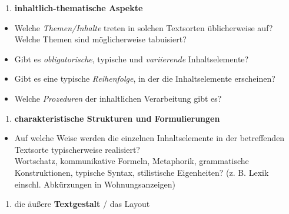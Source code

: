 \documentclass[
  letterpaper,
]{scrbook}
\providecommand{\tightlist}{%
  \setlength{\itemsep}{0pt}\setlength{\parskip}{0pt}}\usepackage{longtable,booktabs,array}
\begin{document}
\begin{enumerate}
\def\labelenumi{\arabic{enumi}.}
\setcounter{enumi}{2}
\tightlist
\item
  \textbf{inhaltlich-thematische Aspekte}\\
\end{enumerate}

\begin{itemize}
\tightlist
\item
  Welche \emph{Themen/Inhalte} treten in solchen Textsorten
  üblicherweise auf? Welche Themen sind möglicherweise tabuisiert?\\
\item
  Gibt es \emph{obligatorische}, typische und \emph{variierende}
  Inhaltselemente?\\
\item
  Gibt es eine typische \emph{Reihenfolge}, in der die Inhaltselemente
  erscheinen?\\
\item
  Welche \emph{Prozeduren} der inhaltlichen Verarbeitung gibt es?\\
\end{itemize}

\begin{enumerate}
\def\labelenumi{\arabic{enumi}.}
\setcounter{enumi}{3}
\tightlist
\item
  \textbf{charakteristische Strukturen und Formulierungen}\\
\end{enumerate}

\begin{itemize}
\tightlist
\item
  Auf welche Weise werden die einzelnen Inhaltselemente in der
  betreffenden Textsorte typischerweise realisiert?\\
  Wortschatz, kommunikative Formeln, Metaphorik, grammatische
  Konstruktionen, typische Syntax, stilistische Eigenheiten? (z. B.
  Lexik einschl. Abkürzungen in Wohnungsanzeigen)\\
\end{itemize}

\begin{enumerate}
\def\labelenumi{\arabic{enumi}.}
\setcounter{enumi}{4}
\tightlist
\item
  die äußere \textbf{Textgestalt} / das Layout\\
\end{enumerate}
\end{document}
